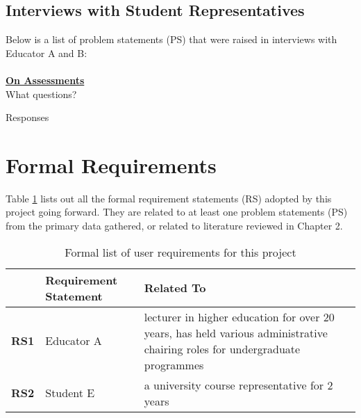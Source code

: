 \subsection{Interviews with Student Representatives}

Below is a list of problem statements (PS) that were raised in interviews with Educator A and B:\\
\\
\underline{\textbf{On Assessments}}
\\
What questions?

Responses

\section{Formal Requirements}

Table \ref{table:formal-reqs} lists out all the formal requirement statements (RS) adopted by this 
project going forward. They are related to at least one problem statements (PS) from the primary data 
gathered, or related to literature reviewed in Chapter 2.

\begin{table}[!h] 
    \caption{Formal list of user requirements for this project}
    \centering
    \label{table:formal-reqs}
    \begin{tabularx}{\textwidth}{>{\bfseries}lXX}
        & Requirement Statement & Related To\\
        \toprule
        RS1 & Educator A & lecturer in higher education for over 20 years, has held various administrative 
        chairing roles for undergraduate programmes\\\midrule
        RS2 & Student E & a university course representative for 2 years\\\bottomrule
    \end{tabularx}
\end{table}